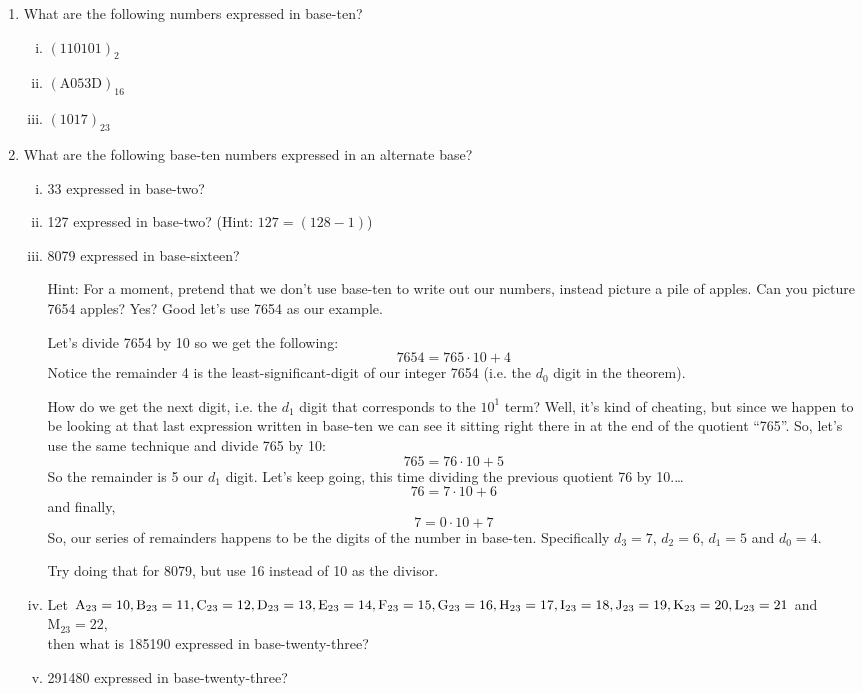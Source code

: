 \documentclass{article}
\begin{document}
\begin{enumerate}
\item What are the following numbers expressed in base-ten?
\begin{enumerate}[i)]
\item $(110101)_2$
\item $(\text{A}053\text{D})_{16}$
\item $(1017)_{23}$
\end{enumerate}
\item What are the following base-ten numbers expressed in an alternate base?
\begin{enumerate}[i)]
\item 33 expressed in base-two?
\item 127 expressed in base-two? (Hint: $127 = (128-1)$)
\item 8079 expressed in base-sixteen?

Hint: For a moment, pretend that we don't use base-ten to
write out our numbers, instead picture a pile of apples.
Can you picture 7654 apples?  Yes?  Good let's use 7654 as our example.

Let's divide 7654 by 10 so we get the following:
\[7654 = 765\cdot{}10+4\]
Notice the remainder 4 is the least-significant-digit of our
integer 7654  (i.e. the $d_0$ digit in the theorem).

How do we get the next digit, i.e. the $d_1$ digit that corresponds to the $10^1$ term? Well, it’s kind of cheating, but
since we happen to be looking at that last expression written in
base-ten we can see it sitting right there in at the
end of the quotient ``765''. So, let's use the same technique and divide 765 by 10:
\[765 = 76\cdot{}10+5\]
So the remainder is 5 our $d_1$ digit.  Let's keep going, this time dividing the previous quotient 76 by 10.\dots	
\[76 = 7\cdot{}10+6\]
and finally,
\[7= 0\cdot{}10+7\]
So, our series of remainders happens to be the digits of the number in base-ten.
Specifically $d_3 = 7$, $d_2=6$, $d_1=5$ and $d_0=4$.

Try doing that for 8079, but use 16 instead of 10 as the divisor.
\item Let $\text{A}_{23} = 10, \text{B}_{23} = 11, \text{C}_{23} = 12, \text{D}_{23} = 13, \text{E}_{23} = 14, \text{F}_{23} = 15,
\text{G}_{23} = 16,\\
\text{H}_{23} = 17, \text{I}_{23} = 18, \text{J}_{23} = 19, \text{K}_{23} = 20, \text{L}_{23} = 21$ and $\text{M}_{23} = 22$,\\
then what is 185190 expressed in base-twenty-three?
\item 291480 expressed in base-twenty-three?
\end{enumerate}

\end{enumerate}
\end{document}
